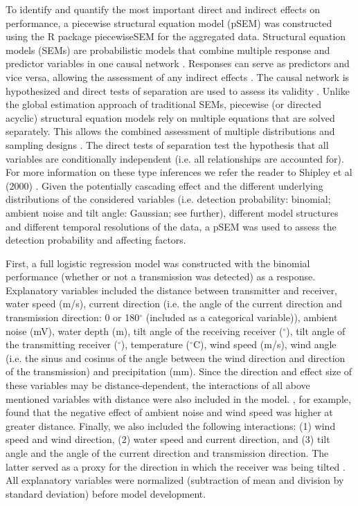 \documentclass[doublespacing,linenumbers]{bmcart}
\begin{document}
To identify and quantify the most important direct and indirect effects on performance, a piecewise structural equation model (pSEM) was constructed using the R package piecewiseSEM for the aggregated data. Structural equation models (SEMs) are probabilistic models that combine multiple response and predictor variables in one causal network \cite{Lefcheck2016PiecewiseSEM:Systematics}. Responses can serve as predictors and vice versa, allowing the assessment of any indirect effects \cite{Deng2021}. The causal network is hypothesized and direct tests of separation are used to assess its validity \cite{Shipley2000AGraphs}. Unlike the global estimation approach of traditional SEMs, piecewise (or directed acyclic) structural equation models rely on multiple equations that are solved separately. This allows the combined assessment of multiple distributions and sampling designs \cite{Lefcheck2016PiecewiseSEM:Systematics}. The direct tests of separation test the hypothesis that all variables are conditionally independent (i.e. all relationships are accounted for). For more information on these type inferences we refer the reader to Shipley et al (2000) \cite{Shipley2000AGraphs}. Given the potentially cascading effect and the different underlying distributions of the considered variables (i.e. detection probability: binomial; ambient noise and tilt angle: Gaussian; see further), different model structures and different temporal resolutions of the data, a pSEM was used to assess the detection probability and affecting factors.  

First, a full logistic regression model was constructed with the binomial performance (whether or not a transmission was detected) as a response. Explanatory variables included the distance between transmitter and receiver, water speed (m/s), current direction (i.e. the angle of the current direction and transmission direction: 0 or 180$^\circ$ (included as a categorical variable)), ambient noise (mV), water depth (m), tilt angle of the receiving receiver ($^{\circ}$), tilt angle of the transmitting receiver ($^{\circ}$), temperature ($^{\circ}$C), wind speed (m/s), wind angle (i.e. the sinus and cosinus of the angle between the wind direction and direction of the transmission) and precipitation (mm). Since the direction and effect size of these variables may be distance-dependent, the interactions of all above mentioned variables with distance were also included in the model. \cite{ReubensBPNS}, for example, found that the negative effect of ambient noise and wind speed was higher at greater distance. Finally, we also included the following interactions: (1) wind speed and wind direction, (2) water speed and current direction, and (3) tilt angle and the angle of the current direction and transmission direction. The latter served as a proxy for the direction in which the receiver was being tilted \cite{Becker2021}. All explanatory variables were normalized (subtraction of mean and division by standard deviation) before model development. 
\end{document}
